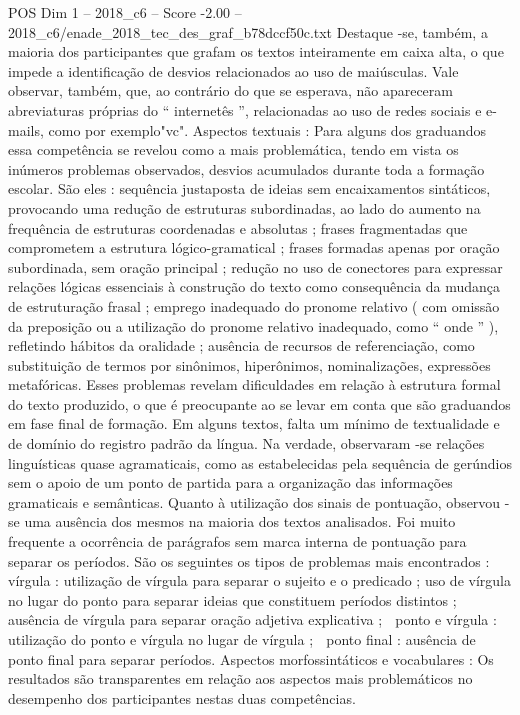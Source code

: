 \begin{textsample}{POS Dim 1 – 2018\_c6 – Score -2.00 – 2018\_c6/enade\_2018\_tec\_des\_graf\_b78dccf50c.txt}
Destaque -se, também, a maioria dos participantes que grafam os textos inteiramente em caixa alta, o que impede a identificação de desvios relacionados ao uso de maiúsculas.
Vale observar, também, que, ao contrário do que se esperava, não apareceram abreviaturas próprias do “ internetês ”, relacionadas ao uso de redes sociais e e-mails, como por exemplo"vc".
Aspectos textuais : Para alguns dos graduandos essa competência se revelou como a mais problemática, tendo em vista os inúmeros problemas observados, desvios acumulados durante toda a formação escolar.
São eles : sequência justaposta de ideias sem encaixamentos sintáticos, provocando uma redução de estruturas subordinadas, ao lado do aumento na frequência de estruturas coordenadas e absolutas ; frases fragmentadas que comprometem a estrutura lógico-gramatical ; frases formadas apenas por oração subordinada, sem oração principal ; redução no uso de conectores para expressar relações lógicas essenciais à construção do texto como consequência da mudança de estruturação frasal ; emprego inadequado do pronome relativo ( com omissão da preposição ou a utilização do pronome relativo inadequado, como “ onde ” ), refletindo hábitos da oralidade ; ausência de recursos de referenciação, como substituição de termos por sinônimos, hiperônimos, nominalizações, expressões metafóricas.
Esses problemas revelam dificuldades em relação à estrutura formal do texto produzido, o que é preocupante ao se levar em conta que são graduandos em fase final de formação.
Em alguns textos, falta um mínimo de textualidade e de domínio do registro padrão da língua.
Na verdade, observaram -se relações linguísticas quase agramaticais, como as estabelecidas pela sequência de gerúndios sem o apoio de um ponto de partida para a organização das informações gramaticais e semânticas.
Quanto à utilização dos sinais de pontuação, observou -se uma ausência dos mesmos na maioria dos textos analisados.
Foi muito frequente a ocorrência de parágrafos sem marca interna de pontuação para separar os períodos.
São os seguintes os tipos de problemas mais encontrados :  vírgula : utilização de vírgula para separar o sujeito e o predicado ; uso de vírgula no lugar do ponto para separar ideias que constituem períodos distintos ; ausência de vírgula para separar oração adjetiva explicativa ;  ponto e vírgula : utilização do ponto e vírgula no lugar de vírgula ;  ponto final : ausência de ponto final para separar períodos.
Aspectos morfossintáticos e vocabulares : Os resultados são transparentes em relação aos aspectos mais problemáticos no desempenho dos participantes nestas duas competências.

\end{textsample}
